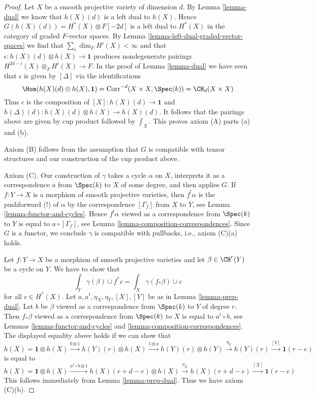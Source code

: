 \begin{proof}
\medskip\noindent
Let $X$ be a smooth projective variety of dimension $d$.
By Lemma \ref{lemma-dual}
we know that $h(X)(d)$ is a left dual to $h(X)$. Hence
$G(h(X)(d)) = H^*(X) \otimes F[-2d]$ is a left dual to
$H^*(X)$ in the category of graded $F$-vector spaces.
By Lemma \ref{lemma-left-dual-graded-vector-spaces}
we find that $\sum_i \dim_F H^i(X) < \infty$ and that
$\epsilon : h(X)(d) \otimes h(X) \to \mathbf{1}$ produces
nondegenerate pairings $H^{2d - i}(X) \otimes_F H^i(X) \to F$.
In the proof of Lemma \ref{lemma-dual} we have seen that
$\epsilon$ is given by $[\Delta]$ via the identifications
$$
\Hom(h(X)(d) \otimes h(X), \mathbf{1}) =
\text{Corr}^{-d}(X \times X, \Spec(k)) =
\CH_d(X \times X)
$$
Thus $\epsilon$ is the composition of $[X] : h(X)(d) \to \mathbf{1}$
and $h(\Delta)(d) : h(X)(d) \otimes h(X) \to h(X)(d)$. It follows
that the pairings above are given by cup product followed by
$\int_X$. This proves axiom (A) parts (a) and (b).

\medskip\noindent
Axiom (B) follows from the assumption that $G$ is compatible
with tensor structures and our construction of the cup product above.

\medskip\noindent
Axiom (C). Our construction of $\gamma$ takes a cycle $\alpha$ on $X$,
interprets it as a correspondence $a$ from $\Spec(k)$ to $X$ of some degree,
and then applies $G$. If $f : Y \to X$ is a morphism of smooth projective
varieties, then $f^!\alpha$ is the pushforward (!) of $\alpha$
by the correspondence $[\Gamma_f]$ from $X$ to $Y$, see
Lemma \ref{lemma-functor-and-cycles}. Hence
$f^!\alpha$ viewed as a correspondence from $\Spec(k)$ to $Y$
is equal to $a \circ [\Gamma_f]$, see
Lemma \ref{lemma-composition-correspondences}.
Since $G$ is a functor, we conclude
$\gamma$ is compatible with pullbacks, i.e., axiom (C)(a) holds.

\medskip\noindent
Let $f : Y \to X$ be a morphism of smooth projective varieties and
let $\beta \in \CH^r(Y)$ be a cycle on $Y$. We have to show that
$$
\int_Y \gamma(\beta) \cup f^*c = \int_X \gamma(f_*\beta) \cup c
$$
for all $c \in H^*(X)$. Let $a, a^t, \eta_X, \eta_Y, [X], [Y]$
be as in Lemma \ref{lemma-prep-dual}.
Let $b$ be $\beta$ viewed as a correspondence from $\Spec(k)$ to $Y$
of degree $r$. Then $f_*\beta$ viewed as a correspondence from
$\Spec(k)$ to $X$ is equal to $a^t \circ b$, see
Lemmas \ref{lemma-functor-and-cycles} and
\ref{lemma-composition-correspondences}.
The displayed equality above holds if we can show that
$$
h(X) = \mathbf{1} \otimes h(X)
\xrightarrow{b \otimes 1}
h(Y)(r) \otimes h(X)
\xrightarrow{1 \otimes a}
h(Y)(r) \otimes h(Y)
\xrightarrow{\eta_Y}
h(Y)(r)
\xrightarrow{[Y]}
\mathbf{1}(r - e)
$$
is equal to
$$
h(X) = \mathbf{1} \otimes h(X)
\xrightarrow{a^t \circ b \otimes 1}
h(X)(r + d - e) \otimes h(X)
\xrightarrow{\eta_X}
h(X)(r + d - e)
\xrightarrow{[X]}
\mathbf{1}(r - e)
$$
This follows immediately from Lemma \ref{lemma-prep-dual}.
Thus we have axiom (C)(b).


\end{proof}
